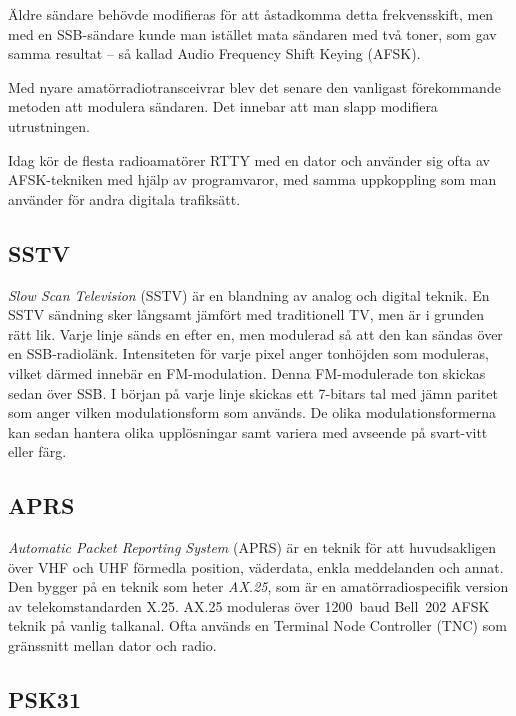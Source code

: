 Äldre sändare behövde modifieras för att åstadkomma detta frekvensskift, men
med en SSB-sändare kunde man istället mata sändaren med två toner, som gav
samma resultat -- så kallad Audio Frequency Shift Keying (AFSK).

Med nyare amatörradiotransceivrar blev det senare den vanligast förekommande
metoden att modulera sändaren.
Det innebar att man slapp modifiera utrustningen.

Idag kör de flesta radioamatörer RTTY med en dator och använder sig ofta av
AFSK-tekniken med hjälp av programvaror, med samma uppkoppling som man använder
för andra digitala trafiksätt.

\subsection{SSTV}

\emph{Slow Scan Television} (SSTV) är en blandning av analog och digital teknik.
En SSTV sändning sker långsamt jämfört med traditionell TV, men är i grunden
rätt lik.
Varje linje sänds en efter en, men modulerad så att den kan sändas över en
SSB-radiolänk.
Intensiteten för varje pixel anger tonhöjden som moduleras, vilket därmed
innebär en FM-modulation.
Denna FM-modulerade ton skickas sedan över SSB.
I början på varje linje skickas ett 7-bitars tal med jämn paritet som anger
vilken modulationsform som används.
De olika modulationsformerna kan sedan hantera olika upplösningar samt variera
med avseende på svart-vitt eller färg.

\subsection{APRS}
\label{modulation_aprs}

\emph{Automatic Packet Reporting System} (APRS) är en teknik för att
huvudsakligen över VHF och UHF förmedla position, väderdata, enkla meddelanden
och annat.
Den bygger på en teknik som heter \emph{AX.25}, som är en amatörradiospecifik
version av telekomstandarden X.25.
AX.25 moduleras över 1200~baud Bell~202 AFSK teknik på vanlig talkanal.
Ofta används en Terminal Node Controller (TNC) som gränssnitt mellan dator och
radio.

\subsection{PSK31}
\label{modulation_psk31}

